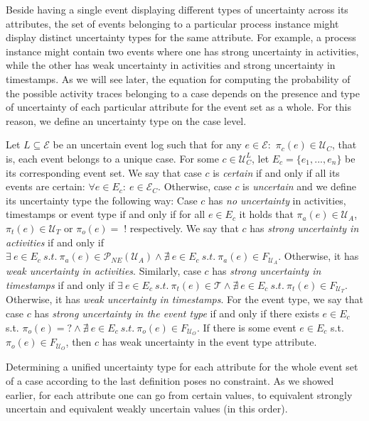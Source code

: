 Beside having a single event displaying different types of uncertainty across its attributes, the set of events belonging to a particular process instance might display distinct uncertainty types for the same attribute.
For example, a process instance might contain two events where one has strong uncertainty in activities, while the other has weak uncertainty in activities and strong uncertainty in timestamps.
As we will see later, the equation for computing the probability of the possible activity traces belonging to a case depends on the presence and type of uncertainty of each particular attribute for the event set as a whole.
For this reason, we define an uncertainty type on the case level.

\begin{definition}
Let $L \subseteq \mathcal{E}$ be an uncertain event log such that for any $e \in \mathcal{E}:$ $\pi_c(e) \in \mathcal{U}_C$, that is, each event belongs to a unique case.
For some $c \in \mathcal{U}_C^L$, let $E_c = \{e_1,...,e_n\}$ be its corresponding event set.
We say that case $c$ is \emph{certain} if and only if all its events are certain: $\forall e \in E_c: ~ e \in \mathcal{E}_C$. 
Otherwise, case $c$ is \emph{uncertain} and we define its uncertainty type the following way:
Case $c$ has \emph{no uncertainty} in activities, timestamps or event type if and only if for all $e \in E_c$ it holds that $\pi_a(e)\in \mathcal{U}_A$, $\pi_t(e) \in \mathcal{U}_T$ or $\pi_o(e)= \;!$ respectively.
We say that $c$ has \emph{strong uncertainty in activities} if and only if 
$\exists ~ e \in E_c ~ s.t. ~ \pi_a(e) \in \mathcal{P}_{NE}(\mathcal{U}_A) \wedge \nexists ~ e \in E_c ~ s.t. ~ \pi_a(e) \in F_{\mathcal{U}_A}$.
Otherwise, it has \emph{weak uncertainty in activities}.
Similarly, case $c$ has \emph{strong uncertainty in timestamps} if and only if $ \exists ~ e \in E_c ~ s.t. ~ \pi_t(e) \in \mathcal{T} \wedge \nexists ~ e \in E_c ~ s.t. ~ \pi_t(e) \in F_{\mathcal{U}_T}$.
Otherwise, it has \emph{weak uncertainty in timestamps}.
For the event type, we say that case $c$ has \emph{strong uncertainty in the event type} if and only if there exists $e \in E_c$ s.t. $\pi_o(e)=? \wedge \nexists ~ e \in E_c ~ s.t. ~ \pi_o(e) \in F_{\mathcal{U}_O}$.
If there is some event $e \in E_c$ s.t. $\pi_o(e) \in F_{\mathcal{U}_O}$, then $c$ has weak uncertainty in the event type attribute.
\end{definition}

Determining a unified uncertainty type for each attribute for the whole event set of a case according to the last definition poses no constraint. 
As we showed earlier, for each attribute one can go from certain values, to equivalent strongly uncertain and equivalent weakly uncertain values (in this order).

